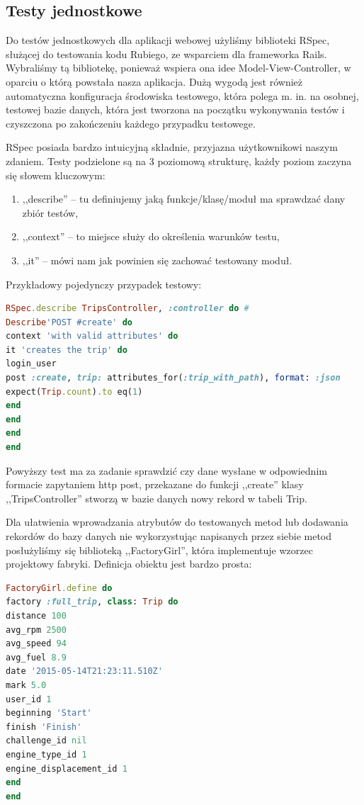 \documentclass[eng,oneside]{mgr}
\begin{document}
\subsection{Testy jednostkowe}
Do testów jednostkowych dla aplikacji webowej użyliśmy biblioteki RSpec, służącej do testowania kodu Rubiego, ze wsparciem dla frameworka Rails. Wybraliśmy tą bibliotekę, ponieważ wspiera ona idee Model-View-Controller, w oparciu o którą powstała nasza aplikacja. Dużą wygodą jest również automatyczna konfiguracja środowiska testowego, która polega m. in.  na osobnej, testowej bazie danych, która jest tworzona na początku wykonywania testów i czyszczona po zakończeniu każdego przypadku testowege.

RSpec posiada bardzo intuicyjną składnie, przyjazna użytkownikowi naszym zdaniem. Testy podzielone są na 3 poziomową strukturę, każdy poziom zaczyna się słowem kluczowym:
\begin{enumerate}
	\item ,,describe'' – tu definiujemy jaką funkcje/klasę/moduł ma sprawdzać dany zbiór testów,
	\item ,,context'' – to miejsce służy do określenia warunków testu,
	\item ,,it'' – mówi nam jak powinien się zachować testowany moduł.
\end{enumerate}

Przykładowy pojedynczy przypadek testowy:

\begin{lstlisting}[language=Ruby, caption={RSpec test jednostkowy.}]
RSpec.describe TripsController, :controller do #
Describe'POST #create' do
context 'with valid attributes' do
it 'creates the trip' do
login_user
post :create, trip: attributes_for(:trip_with_path), format: :json
expect(Trip.count).to eq(1)
end
end
end
end
\end{lstlisting}

Powyższy test ma za zadanie sprawdzić czy dane wysłane w odpowiednim formacie zapytaniem http post, przekazane do funkcji ,,create'' klasy ,,TripsController'' stworzą w bazie danych nowy rekord w tabeli Trip. 

Dla ułatwienia wprowadzania atrybutów do testowanych metod lub dodawania rekordów do bazy danych nie wykorzystując napisanych przez siebie metod posłużyliśmy się biblioteką ,,FactoryGirl'', która implementuje wzorzec projektowy fabryki. Definicja obiektu jest bardzo prosta:

\begin{lstlisting}[language=Ruby, caption={Definicja FactoryGirl.}]
FactoryGirl.define do 
factory :full_trip, class: Trip do
distance 100
avg_rpm 2500
avg_speed 94
avg_fuel 8.9
date '2015-05-14T21:23:11.510Z'
mark 5.0
user_id 1
beginning 'Start'
finish 'Finish'
challenge_id nil
engine_type_id 1
engine_displacement_id 1
end
end
\end{lstlisting}
\end{document}

